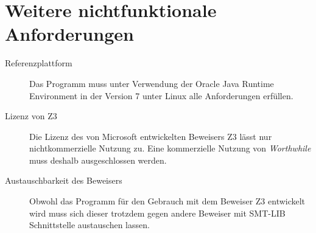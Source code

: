 \section{Weitere nichtfunktionale Anforderungen}%

\begin{description}%
    \item [Referenzplattform] Das Programm muss unter Verwendung der Oracle Java Runtime Environment in der Version 7 unter Linux alle Anforderungen erfüllen.
    \item [Lizenz von Z3] Die Lizenz des von Microsoft entwickelten Beweisers Z3 lässt nur nichtkommerzielle Nutzung zu. Eine kommerzielle Nutzung von \emph{Worthwhile} muss deshalb ausgeschlossen werden.
    \item [Austauschbarkeit des Beweisers] Obwohl das Programm für den Gebrauch mit dem Beweiser Z3 entwickelt wird muss sich dieser trotzdem gegen andere Beweiser mit SMT-LIB Schnittstelle austauschen lassen.
\end{description}
